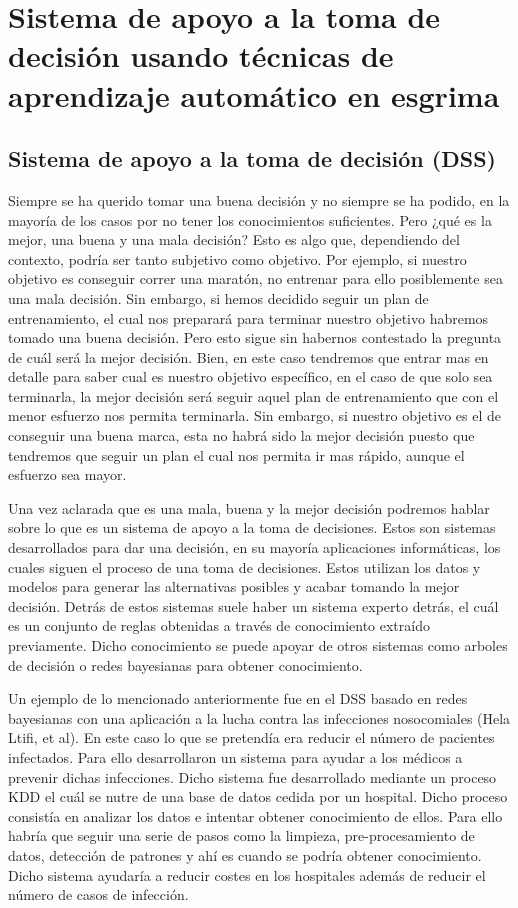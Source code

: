 \newline

\section{Sistema de apoyo a la toma de decisión usando técnicas de aprendizaje automático en esgrima}
\subsection{Sistema de apoyo a la toma de decisión (DSS)}

Siempre se ha querido tomar una buena decisión y no siempre se ha podido, en la mayoría de los casos
 por no tener los conocimientos suficientes. Pero ¿qué es la mejor, una buena y una mala decisión?
 Esto es algo que, dependiendo del contexto, podría ser tanto subjetivo como objetivo. Por ejemplo, si nuestro
 objetivo es conseguir correr una maratón, no entrenar para ello posiblemente sea una mala decisión.
 Sin embargo, si hemos decidido seguir un plan de entrenamiento, el cual nos preparará para terminar
 nuestro objetivo habremos tomado una buena decisión. Pero esto sigue sin habernos contestado la pregunta
 de cuál será la mejor decisión. Bien, en este caso tendremos que entrar mas en detalle para saber
 cual es nuestro objetivo específico, en el caso de que solo sea terminarla, la mejor decisión será seguir aquel
 plan de entrenamiento que con el menor esfuerzo nos permita terminarla. Sin embargo, si nuestro objetivo
 es el de conseguir una buena marca, esta no habrá sido la mejor decisión puesto que tendremos que
 seguir un plan el cual nos permita ir mas rápido, aunque el esfuerzo sea mayor.

Una vez aclarada que es una mala, buena y la mejor decisión podremos hablar sobre lo que es un sistema
 de apoyo a la toma de decisiones. Estos son sistemas desarrollados para dar una decisión, en su mayoría
 aplicaciones informáticas, los cuales siguen el proceso de una toma de decisiones. Estos utilizan
 los datos y modelos para generar las alternativas posibles y acabar tomando la mejor decisión. Detrás
 de estos sistemas suele haber un sistema experto detrás, el cuál es un conjunto de reglas obtenidas
 a través de conocimiento extraído previamente. Dicho conocimiento se puede apoyar de otros sistemas como
 arboles de decisión o redes bayesianas para obtener conocimiento.

Un ejemplo de lo mencionado anteriormente fue en el DSS basado en redes bayesianas con una aplicación
 a la lucha contra las infecciones nosocomiales (Hela Ltifi, et al). En este caso lo que se pretendía
 era reducir el número de pacientes infectados. Para ello desarrollaron un sistema para ayudar a los
 médicos a prevenir dichas infecciones. Dicho sistema fue desarrollado mediante un proceso KDD el
 cuál se nutre de una base de datos cedida por un hospital. Dicho proceso consistía en analizar los datos
 e intentar obtener conocimiento de ellos. Para ello habría que seguir una serie de pasos como la
 limpieza, pre-procesamiento de datos, detección de patrones y ahí es cuando se podría obtener conocimiento.
 Dicho sistema ayudaría a reducir costes en los hospitales además de reducir el número de casos de infección.

